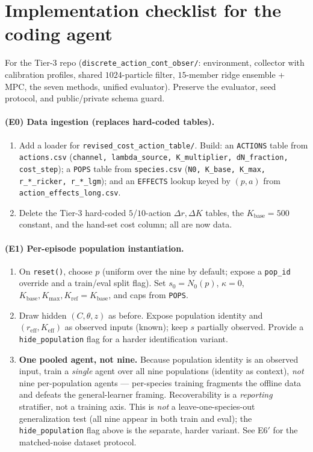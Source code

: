 \documentclass[11pt]{article}
\newcommand{\reff}{r_{\mathrm{eff}}}
\newcommand{\Keff}{K_{\mathrm{eff}}}
\newcommand{\Kbase}{K_{\mathrm{base}}}
\newcommand{\Kref}{K_{\mathrm{ref}}}
\newcommand{\Kmax}{K_{\max}}
\newcommand{\code}[1]{\texttt{#1}}
\begin{document}
\section{Implementation checklist for the coding agent}
For the Tier-3 repo (\code{discrete\_action\_cont\_obser/}: environment, collector
with calibration profiles, shared $1024$-particle filter, $15$-member ridge ensemble
+ MPC, the seven methods, unified evaluator). Preserve the evaluator, seed protocol,
and public/private schema guard.

\paragraph{(E0) Data ingestion (replaces hard-coded tables).}
\begin{enumerate}[leftmargin=1.8em,nosep]
\item Add a loader for \texttt{revised\_cost\_}\allowbreak\texttt{action\_table/}. Build:
an \code{ACTIONS}
table from \code{actions.csv} (\code{channel, lambda\_source, K\_multiplier,
dN\_fraction, cost\_step}); a \code{POPS} table from \code{species.csv} (\code{N0,
K\_base, K\_max, r\_*\_ricker, r\_*\_lgm}); and an \code{EFFECTS} lookup keyed by
$(p,a)$ from \texttt{action\_}\allowbreak\texttt{effects\_long.csv}.
\item Delete the Tier-3 hard-coded $5$/$10$-action $\Delta r,\Delta K$ tables, the
$\Kbase{=}500$ constant, and the hand-set cost column; all are now data.
\end{enumerate}

\paragraph{(E1) Per-episode population instantiation.}
\begin{enumerate}[leftmargin=1.8em,nosep]
\item On \code{reset()}, choose $p$ (uniform over the nine by default; expose a
\code{pop\_id} override and a train/eval split flag). Set $s_0{=}N_0(p)$,
$\kappa{=}0$, $\Kbase,\Kmax,\Kref{=}\Kbase$, and caps from \code{POPS}.
\item Draw hidden $(C,\theta,z)$ as before. Expose population identity and
$(\reff,\Keff)$ as observed inputs (known); keep $s$ partially observed. Provide a
\code{hide\_population} flag for a harder identification variant.
\item \textbf{One pooled agent, not nine.} Because population identity is an observed
input, train a \emph{single} agent over all nine populations (identity as context),
\emph{not} nine per-population agents --- per-species training fragments the offline
data and defeats the general-learner framing. Recoverability is a \emph{reporting}
stratifier, not a training axis. This is \emph{not} a leave-one-species-out
generalization test (all nine appear in both train and eval); the
\code{hide\_population} flag above is the separate, harder variant. See E6$'$ for the
matched-noise dataset protocol.
\end{enumerate}
\end{document}
